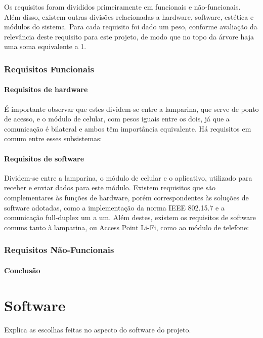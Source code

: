 	Os requisitos foram divididos primeiramente em funcionais e não-funcionais. Além disso, existem outras divisões relacionadas a hardware, software, estética e módulos do sistema. Para cada requisito foi dado um peso, conforme avaliação da relevância deste requisito para este projeto, de modo que no topo da árvore haja uma soma equivalente a 1.
	
	\subsubsection{Requisitos Funcionais}\label{subsubsec-requisitos-func}
	
	\paragraph{Requisitos de hardware} 
	
	É importante observar que estes dividem-se entre a lamparina, que serve de ponto de acesso, e o módulo de celular, com pesos iguais entre os dois, já que a comunicação é bilateral e ambos têm importância equivalente. Há requisitos em comum entre esses subsistemas:
	

	\paragraph{Requisitos de software} 
	Dividem-se entre a lamparina, o módulo de celular e o aplicativo, utilizado para receber e enviar dados para este módulo. Existem requisitos que são complementares às funções de hardware, porém correspondentes às soluções de software adotadas, como a implementação da norma IEEE 802.15.7 e a comunicação full-duplex um a um. Além destes, existem os requisitos de software comuns tanto à lamparina, ou Access Point Li-Fi, como ao módulo de telefone:
	

	\subsubsection{Requisitos Não-Funcionais}\label{subsubsec-requisitos-nfunc}
	


	
	\paragraph{Conclusão}
	

	\section{Software}\label{sec-software}
	
	Explica as escolhas feitas no aspecto do software do projeto.
	
